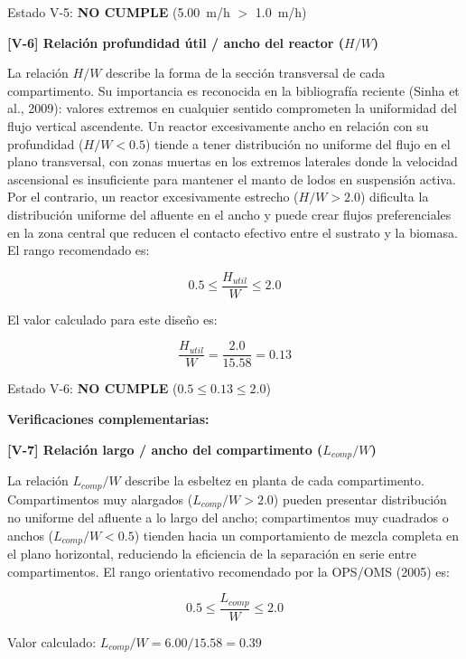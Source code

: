 \documentclass[12pt,a4paper]{article}
\begin{document}
Estado V-5: \textbf{NO CUMPLE} (5.00~m/h $>$ 1.0~m/h)

\textbf{[V-6] Relación profundidad útil / ancho del reactor ($H/W$)}

La relación $H/W$ describe la forma de la sección transversal de cada compartimento. Su importancia es reconocida en la bibliografía reciente (Sinha et al., 2009): valores extremos en cualquier sentido comprometen la uniformidad del flujo vertical ascendente. Un reactor excesivamente ancho en relación con su profundidad ($H/W < 0.5$) tiende a tener distribución no uniforme del flujo en el plano transversal, con zonas muertas en los extremos laterales donde la velocidad ascensional es insuficiente para mantener el manto de lodos en suspensión activa. Por el contrario, un reactor excesivamente estrecho ($H/W > 2.0$) dificulta la distribución uniforme del afluente en el ancho y puede crear flujos preferenciales en la zona central que reducen el contacto efectivo entre el sustrato y la biomasa. El rango recomendado es:

\begin{equation}
0.5 \leq \frac{H_{util}}{W} \leq 2.0
\end{equation}

El valor calculado para este diseño es:

\begin{equation}
\frac{H_{util}}{W} = \frac{2.0}{15.58} = 0.13
\end{equation}

Estado V-6: \textbf{NO CUMPLE} ($0.5 \leq 0.13 \leq 2.0$)

\textbf{Verificaciones complementarias:}

\textbf{[V-7] Relación largo / ancho del compartimento ($L_{comp} / W$)}

La relación $L_{comp} / W$ describe la esbeltez en planta de cada compartimento. Compartimentos muy alargados ($L_{comp} / W > 2.0$) pueden presentar distribución no uniforme del afluente a lo largo del ancho; compartimentos muy cuadrados o anchos ($L_{comp} / W < 0.5$) tienden hacia un comportamiento de mezcla completa en el plano horizontal, reduciendo la eficiencia de la separación en serie entre compartimentos. El rango orientativo recomendado por la OPS/OMS (2005) es:

\begin{equation}
0.5 \leq \frac{L_{comp}}{W} \leq 2.0
\end{equation}

Valor calculado: $L_{comp} / W = 6.00 / 15.58 = 0.39$
\end{document}
